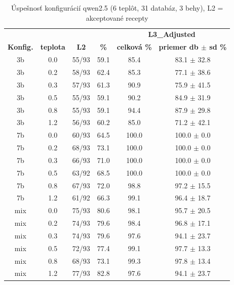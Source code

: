 \begin{table}[H]
    \centering
    \small
    \begin{tabular}{cccccc}
    \toprule
    & & & & \multicolumn{2}{c}{\textbf{L3\_Adjusted}} \\
    \textbf{Konfig.} & \textbf{teplota} & \textbf{L2} & \textbf{\%} & \textbf{celková \%} & \textbf{priemer db $\pm$ sd \%} \\
    \midrule
        3b & 0.0 & 55/93 & 59.1 & 85.4 & 83.1 $\pm$ 32.8 \\ 
        3b & 0.2 & 58/93 & 62.4 &  85.3 & 77.1 $\pm$ 38.6 \\ 
        3b & 0.3 & 57/93 & 61.3 &  90.9 & 75.9 $\pm$ 41.5 \\ 
        3b & 0.5 & 55/93 & 59.1 &  90.2 & 84.9 $\pm$ 31.9 \\ 
        3b & 0.8 & 55/93 & 59.1 & 94.4 & 87.9 $\pm$ 29.8 \\
        3b & 1.2 & 56/93 & 60.2 & 85.0 & 71.2 $\pm$ 42.1 \\
        \midrule
        7b & 0.0 & 60/93 & 64.5 &  100.0 & 100.0 $\pm$ 0.0 \\ 
        7b & 0.2 & 68/93 & 73.1 & 100.0 & 100.0 $\pm$ 0.0 \\ 
        7b & 0.3 & 66/93 & 71.0 &  100.0 & 100.0 $\pm$ 0.0 \\ 
        7b & 0.5 & 63/92 & 68.5 &  100.0 & 100.0 $\pm$ 0.0 \\ 
        7b & 0.8 & 67/93 & 72.0 &  98.8 & 97.2 $\pm$ 15.5 \\ 
        7b & 1.2 & 61/92 & 66.3 &  99.1 & 96.4 $\pm$ 18.7 \\ 
        \midrule
        mix & 0.0 & 75/93 & 80.6 &  98.1 & 95.7 $\pm$ 20.5 \\ 
        mix & 0.2 & 74/93 & 79.6 &  98.4 & 96.8 $\pm$ 17.1 \\
        mix & 0.3 & 74/93 & 79.6 &  97.6 & 94.1 $\pm$ 23.7 \\ 
        mix & 0.5 & 72/93 & 77.4 &  99.1 & 97.7 $\pm$ 13.3 \\ 
        mix & 0.8 & 68/93 & 73.1 &  99.3 & 97.8 $\pm$ 13.4 \\ 
        mix & 1.2 & 77/93 & 82.8 &  97.6 & 94.1 $\pm$ 23.7 \\ 
    \bottomrule
    \end{tabular}
    \caption{Úspešnosť konfigurácií qwen2.5 (6 teplôt, 31 databáz, 3 behy), L2 = akceptované recepty}
    \label{tab:vysledky_jadro}
\end{table}



